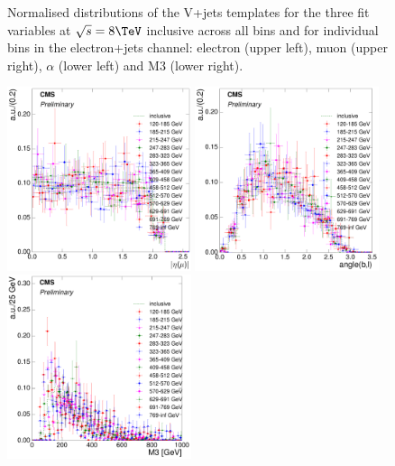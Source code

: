 \begin{figure}[hbtp]
	 \caption{Normalised distributions of the V+jets templates for the three fit variables at $\sqrt{s}=8\TeV$
	 inclusive across all \HT bins and for individual \HT bins in the electron+jets channel: electron \abseta
	 (upper left), muon \abseta (upper right), $\alpha$ (lower left) and M3 (lower right).}
     \label{fig:HT_fit_variable_vjets_comparisons_electron_8TeV}
\end{figure}

\begin{figure}[hbtp]
    \centering
     \includegraphics[width=0.48\textwidth]{Chapters/04_Analysis/04b_XSections/images/8TeV/fit_variables/muon/HT/muon_absolute_eta/vjets/HT_muon_absolute_eta_2orMoreBtags_VJets_template_comparison.pdf}\hfill
     \includegraphics[width=0.48\textwidth]{Chapters/04_Analysis/04b_XSections/images/8TeV/fit_variables/muon/HT/angle_bl/vjets/HT_angle_bl_2orMoreBtags_VJets_template_comparison.pdf}\hfill
     \includegraphics[width=0.48\textwidth]{Chapters/04_Analysis/04b_XSections/images/8TeV/fit_variables/muon/HT/M3/vjets/HT_M3_2orMoreBtags_VJets_template_comparison.pdf}\\

\end{figure}
